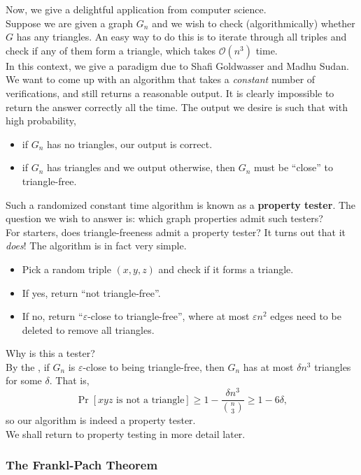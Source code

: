 			Now, we give a delightful application from computer science.\\
			Suppose we are given a graph $G_n$ and we wish to check (algorithmically) whether $G$ has any triangles. An easy way to do this is to iterate through all triples and check if any of them form a triangle, which takes $\mathcal{O}(n^3)$ time.\\
			In this context, we give a paradigm due to Shafi Goldwasser and Madhu Sudan. We want to come up with an algorithm that takes a \emph{constant} number of verifications, and still returns a reasonable output. It is clearly impossible to return the answer correctly all the time. The output we desire is such that with high probability,
			\begin{itemize}
				\item if $G_n$ has no triangles, our output is correct.
				\item if $G_n$ has triangles and we output otherwise, then $G_n$ must be ``close'' to triangle-free.
			\end{itemize}
			Such a randomized constant time algorithm is known as a \textbf{property tester}. The question we wish to answer is: which graph properties admit such testers?\\
			For starters, does triangle-freeness admit a property tester? It turns out that it \emph{does}! The algorithm is in fact very simple.

			\begin{itemize}
				\item Pick a random triple $(x,y,z)$ and check if it forms a triangle.
				\item If yes, return ``not triangle-free''.
				\item If no, return ``$\varepsilon$-close to triangle-free'', where at most $\varepsilon n^2$ edges need to be deleted to remove all triangles.
			\end{itemize}

			Why is this a tester?\\
			By the , if $G_n$ is $\varepsilon$-close to being triangle-free, then $G_n$ has at most $\delta n^3$ triangles for some $\delta$. That is,
			\[ \Pr[xyz \text{ is not a triangle}] \ge 1 - \frac{\delta n^3}{\binom{n}{3}} \ge 1 - 6\delta, \]
			so our algorithm is indeed a property tester.\\
			We shall return to property testing in more detail later.

		\subsubsection{The Frankl-Pach Theorem}

